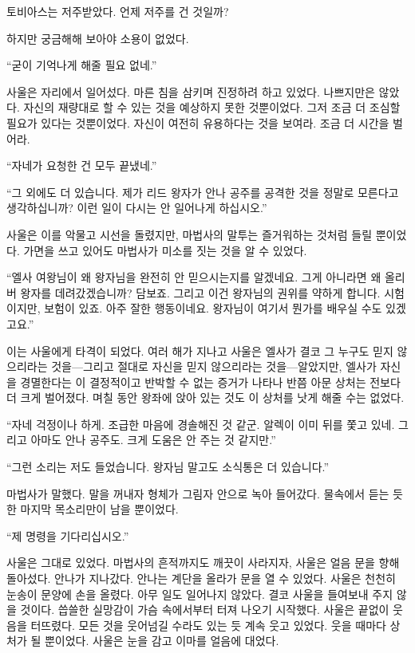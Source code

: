 토비아스는 저주받았다. 언제 저주를 건 것일까?

하지만 궁금해해 보아야 소용이 없었다.

``굳이 기억나게 해줄 필요 없네.''

사울은 자리에서 일어섰다. 마른 침을 삼키며 진정하려 하고 있었다. 나쁘지만은 않았다. 자신의 재량대로 할 수 있는 것을 예상하지 못한 것뿐이었다. 그저 조금 더 조심할 필요가 있다는 것뿐이었다. 자신이 여전히 유용하다는 것을 보여라. 조금 더 시간을 벌어라.

``자네가 요청한 건 모두 끝냈네.''

``그 외에도 더 있습니다. 제가 리드 왕자가 안나 공주를 공격한 것을 정말로 모른다고 생각하십니까? 이런 일이 다시는 안 일어나게 하십시오.''

사울은 이를 악물고 시선을 돌렸지만, 마법사의 말투는 즐거워하는 것처럼 들릴 뿐이었다. 가면을 쓰고 있어도 마법사가 미소를 짓는 것을 알 수 있었다.

``엘사 여왕님이 왜 왕자님을 완전히 안 믿으시는지를 알겠네요. 그게 아니라면 왜 올리버 왕자를 데려갔겠습니까? 담보죠. 그리고 이건 왕자님의 권위를 약하게 합니다. 시험이지만, 보험이 있죠. 아주 잘한 행동이네요. 왕자님이 여기서 뭔가를 배우실 수도 있겠고요.''

이는 사울에게 타격이 되었다. 여러 해가 지나고 사울은 엘사가 결코 그 누구도 믿지 않으리라는 것을—그리고 절대로 자신을 믿지 않으리라는 것을—알았지만, 엘사가 자신을 경멸한다는 이 결정적이고 반박할 수 없는 증거가 나타나 반쯤 아문 상처는 전보다 더 크게 벌어졌다. 며칠 동안 왕좌에 앉아 있는 것도 이 상처를 낫게 해줄 수는 없었다.

``자네 걱정이나 하게. 조급한 마음에 경솔해진 것 같군. 알렉이 이미 뒤를 쫓고 있네. 그리고 아마도 안나 공주도. 크게 도움은 안 주는 것 같지만.''

``그런 소리는 저도 들었습니다. 왕자님 말고도 소식통은 더 있습니다.''

마법사가 말했다. 말을 꺼내자 형체가 그림자 안으로 녹아 들어갔다. 물속에서 듣는 듯한 마지막 목소리만이 남을 뿐이었다.

``제 명령을 기다리십시오.''

사울은 그대로 있었다. 마법사의 흔적까지도 깨끗이 사라지자, 사울은 얼음 문을 향해 돌아섰다. 안나가 지나갔다. 안나는 계단을 올라가 문을 열 수 있었다. 사울은 천천히 눈송이 문양에 손을 올렸다. 아무 일도 일어나지 않았다. 결코 사울을 들여보내 주지 않을 것이다. 씁쓸한 실망감이 가슴 속에서부터 터져 나오기 시작했다. 사울은 끝없이 웃음을 터뜨렸다. 모든 것을 웃어넘길 수라도 있는 듯 계속 웃고 있었다. 웃을 때마다 상처가 될 뿐이었다. 사울은 눈을 감고 이마를 얼음에 대었다.

